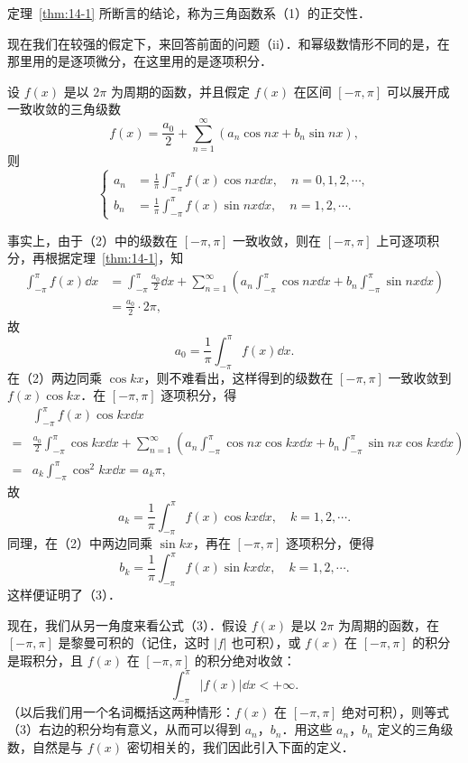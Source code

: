 定理~\ref{thm:14-1} 所断言的结论，称为三角函数系（1）的正交性．

现在我们在较强的假定下，来回答前面的问题（ii）．和幂级数情形不同的是，在那里用的是逐项微分，在这里用的是逐项积分．

设 $f(x)$ 是以 $2\pi$ 为周期的函数，并且假定 $f(x)$ 在区间 $[-\pi,\pi]$ 可以展开成一致收敛的三角级数
\begin{equation}
f(x)=\frac{a_{0}}{2}+\sum_{n=1}^{\infty}\left(a_{n}\cos nx+b_{n}\sin nx\right),
\tag{2}
\end{equation}
则
\begin{equation}
\left\{\begin{aligned}
a_{n}&=\frac{1}{\pi}\int_{-\pi}^{\pi}f(x)\cos nx\dd x,\quad n=0,1,2,\cdots,\\
b_{n}&=\frac{1}{\pi}\int_{-\pi}^{\pi}f(x)\sin nx\dd x,\quad n=1,2,\cdots.
\end{aligned}\right.
\tag{3}
\end{equation}

事实上，由于（2）中的级数在 $[-\pi,\pi]$ 一致收敛，则在 $[-\pi,\pi]$ 上可逐项积分，再根据定理~\ref{thm:14-1}，知
\[
\begin{aligned}
\int_{-\pi}^{\pi}f(x)\dd x&=\int_{-\pi}^{\pi}\frac{a_{0}}{2}\dd x+\sum_{n=1}^{\infty}\left(a_{n}\int_{-\pi}^{\pi}\cos nx\dd x+b_{n}\int_{-\pi}^{\pi}\sin nx\dd x\right)\\
&=\frac{a_{0}}{2}\cdot 2\pi,
\end{aligned}
\]
故
\[
a_{0}=\frac{1}{\pi}\int_{-\pi}^{\pi}f(x)\dd x.
\]
在（2）两边同乘 $\cos kx$，则不难看出，这样得到的级数在 $[-\pi,\pi]$ 一致收敛到 $f(x)\cos kx$．在 $[-\pi,\pi]$ 逐项积分，得
\[
\begin{aligned}
&\int_{-\pi}^{\pi}f(x)\cos kx\dd x\\
={}&\frac{a_{0}}{2}\int_{-\pi}^{\pi}\cos kx\dd x+\sum_{n=1}^{\infty}\left(a_{n}\int_{-\pi}^{\pi}\cos nx\cos kx\dd x+b_{n}\int_{-\pi}^{\pi}\sin nx\cos kx\dd x\right)\\
={}&a_{k}\int_{-\pi}^{\pi}\cos^{2}kx\dd x=a_{k}\pi,
\end{aligned}
\]
故
\[
a_{k}=\frac{1}{\pi}\int_{-\pi}^{\pi}f(x)\cos kx\dd x,\quad k=1,2,\cdots.
\]
同理，在（2）中两边同乘 $\sin kx$，再在 $[-\pi,\pi]$ 逐项积分，便得
\[
b_{k}=\frac{1}{\pi}\int_{-\pi}^{\pi}f(x)\sin kx\dd x,\quad k=1,2,\cdots.
\]
这样便证明了（3）．

现在，我们从另一角度来看公式（3）．假设 $f(x)$ 是以 $2\pi$ 为周期的函数，在 $[-\pi,\pi]$ 是黎曼可积的（记住，这时 $\left|f\right|$ 也可积），或 $f(x)$ 在 $[-\pi,\pi]$ 的积分是瑕积分，且 $f(x)$ 在 $[-\pi,\pi]$ 的积分绝对收敛：
\[
\int_{-\pi}^{\pi}\left|f(x)\right|\dd x<+\infty.
\]
（以后我们用一个名词概括这两种情形：$f(x)$ 在 $[-\pi,\pi]$ 绝对可积），则等式（3）右边的积分均有意义，从而可以得到 $a_{n}$，$b_{n}$．用这些 $a_{n}$，$b_{n}$ 定义的三角级数，自然是与 $f(x)$ 密切相关的，我们因此引入下面的定义．

